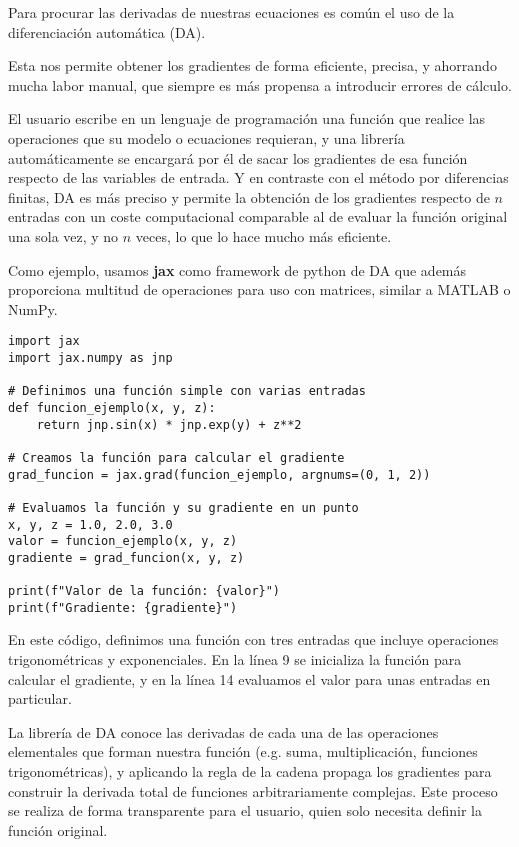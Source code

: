 Para procurar las derivadas de nuestras ecuaciones es común el uso de la
diferenciación automática (DA).

Esta nos permite obtener los gradientes de forma eficiente, precisa, y
ahorrando mucha labor manual, que siempre es más propensa a introducir errores
de cálculo.

El usuario escribe en un lenguaje de programación una función que realice las
operaciones que su modelo o ecuaciones requieran, y una librería
automáticamente se encargará por él de sacar los gradientes de esa función
respecto de las variables de entrada. Y en contraste con el método por
diferencias finitas, DA es más preciso y permite la obtención de los gradientes
respecto de $n$ entradas con un coste computacional comparable al de evaluar la
función original una sola vez, y no $n$ veces, lo que lo hace mucho más
eficiente.

Como ejemplo, usamos \textbf{jax} \cite{jax2018github} como framework de python
de DA que además proporciona multitud de operaciones para uso con matrices,
similar a MATLAB o NumPy.

\begin{verbatim}
import jax
import jax.numpy as jnp

# Definimos una función simple con varias entradas
def funcion_ejemplo(x, y, z):
    return jnp.sin(x) * jnp.exp(y) + z**2

# Creamos la función para calcular el gradiente
grad_funcion = jax.grad(funcion_ejemplo, argnums=(0, 1, 2))

# Evaluamos la función y su gradiente en un punto
x, y, z = 1.0, 2.0, 3.0
valor = funcion_ejemplo(x, y, z)
gradiente = grad_funcion(x, y, z)

print(f"Valor de la función: {valor}")
print(f"Gradiente: {gradiente}")
\end{verbatim}

En este código, definimos una función con tres entradas que incluye operaciones
trigonométricas y exponenciales. En la línea 9 se inicializa la función para
calcular el gradiente, y en la línea 14 evaluamos el valor para unas entradas
en particular.

La librería de DA conoce las derivadas de cada una de las operaciones
elementales que forman nuestra función (e.g. suma, multiplicación, funciones
trigonométricas), y aplicando la regla de la cadena propaga los gradientes para
construir la derivada total de funciones arbitrariamente complejas. Este
proceso se realiza de forma transparente para el usuario, quien solo necesita
definir la función original.

